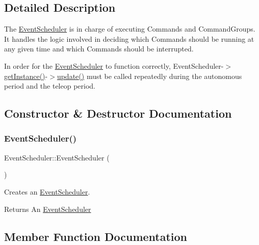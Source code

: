 \subsection{Detailed Description}
The \mbox{\hyperlink{classlib_iterative_robot_1_1_event_scheduler}{Event\+Scheduler}} is in charge of executing Commands and Command\+Groups. It handles the logic involved in deciding which Commands should be running at any given time and which Commands should be interrupted.

In order for the \mbox{\hyperlink{classlib_iterative_robot_1_1_event_scheduler}{Event\+Scheduler}} to function correctly, Event\+Scheduler-\/$>$\mbox{\hyperlink{classlib_iterative_robot_1_1_event_scheduler_a04480f5533265708f49b23e622ffe9cb}{get\+Instance()}}-\/$>$\mbox{\hyperlink{classlib_iterative_robot_1_1_event_scheduler_a9643c8e8dd7a87a1a3419415c7cc46bc}{update()}} must be called repeatedly during the autonomous period and the teleop period. 

\subsection{Constructor \& Destructor Documentation}
\mbox{\label{classlib_iterative_robot_1_1_event_scheduler_a5d0af0bdbbb5948ab06075ef12fc8aa0}} 
\subsubsection{\texorpdfstring{EventScheduler()}{EventScheduler()}}
{\footnotesize\ttfamily Event\+Scheduler\+::\+Event\+Scheduler (\begin{DoxyParamCaption}{ }\end{DoxyParamCaption})\hspace{0.3cm}{\ttfamily [private]}}



Creates an \mbox{\hyperlink{classlib_iterative_robot_1_1_event_scheduler}{Event\+Scheduler}}. 

\begin{DoxyReturn}{Returns}
An \mbox{\hyperlink{classlib_iterative_robot_1_1_event_scheduler}{Event\+Scheduler}} 
\end{DoxyReturn}


\subsection{Member Function Documentation}
\mbox{\label{classlib_iterative_robot_1_1_event_scheduler_a7092829578475f88390b7a8c54146299}} 
